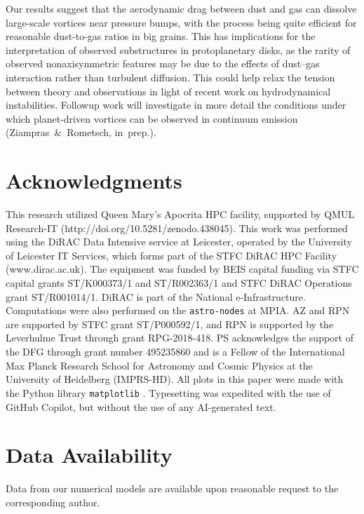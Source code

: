 \documentclass[fleqn,usenatbib,useAMS]{mnras}
\begin{document}
Our results suggest that the aerodynamic drag between dust and gas can dissolve large-scale vortices near pressure bumps, with the process being quite efficient for reasonable dust-to-gas ratios in big grains. This has implications for the interpretation of observed substructures in protoplanetary disks, as the rarity of observed nonaxisymmetric features may be due to the effects of dust--gas interaction rather than turbulent diffusion. This could help relax the tension between theory and observations in light of recent work on hydrodynamical instabilities. Followup work will investigate in more detail the conditions under which planet-driven vortices can be observed in continuum emission (Ziampras~\&~Rometsch, in~prep.).

\section*{Acknowledgments}
This research utilized Queen Mary's Apocrita HPC facility, supported by QMUL Research-IT (http://doi.org/10.5281/zenodo.438045). This work was performed using the DiRAC Data Intensive service at Leicester, operated by the University of Leicester IT Services, which forms part of the STFC DiRAC HPC Facility (www.dirac.ac.uk). The equipment was funded by BEIS capital funding via STFC capital grants ST/K000373/1 and ST/R002363/1 and STFC DiRAC Operations grant ST/R001014/1. DiRAC is part of the National e-Infrastructure. Computations were also performed on the \texttt{astro-nodes} at MPIA. AZ and RPN are supported by STFC grant ST/P000592/1, and RPN is supported by the Leverhulme Trust through grant RPG-2018-418. PS acknowledges the support of the DFG through grant number 495235860 and is a Fellow of the International Max Planck Research School for Astronomy and Cosmic Physics at the University of Heidelberg (IMPRS-HD). All plots in this paper were made with the Python library \texttt{matplotlib} \citep{hunter-2007}. Typesetting was expedited with the use of GitHub Copilot, but without the use of any AI-generated text.

\section*{Data Availability}

Data from our numerical models are available upon reasonable request to the corresponding author.



\end{document}
